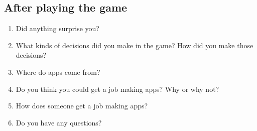 \documentclass[letterpaper]{article}
\begin{document}
\subsection*{After playing the game}

\begin{enumerate}
\item Did anything surprise you?
\item What kinds of decisions did you make in the game? How did you make those decisions?
\item Where do apps come from?
\item Do you think you could get a job making apps? Why or why not?
\item How does someone get a job making apps?
\item Do you have any questions?
\end{enumerate}

\clearpage
\end{document}
